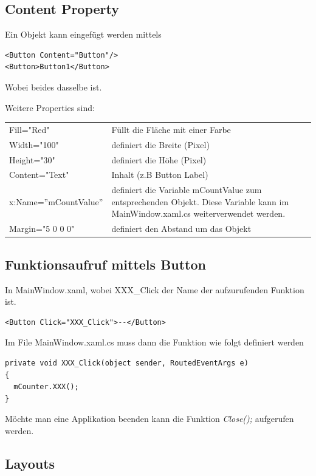 \subsection{Content Property}
Ein Objekt kann eingefügt werden mittels
\begin{lstlisting}[style=CSharp]
<Button Content="Button"/>
<Button>Button1</Button>
\end{lstlisting}
Wobei beides dasselbe ist.


Weitere Properties sind:\\
\begin{tabular}{lp{12cm}}
  Fill="Red" & Füllt die Fläche mit einer Farbe \\
  Width="100" & definiert die Breite (Pixel) \\
  Height="30" & definiert die Höhe (Pixel) \\
  Content="Text" & Inhalt (z.B Button Label) \\
  x:Name=''mCountValue'' & definiert die Variable mCountValue zum entsprechenden Objekt.
                         Diese Variable kann im MainWindow.xaml.cs weiterverwendet werden.\\
  Margin="5 0 0 0" & definiert den Abstand um das Objekt\\
\end{tabular}

\subsection{Funktionsaufruf mittels Button}
In MainWindow.xaml, wobei XXX\_Click der Name der aufzurufenden Funktion ist.
\begin{lstlisting}[style=CSharp]
<Button Click="XXX_Click">--</Button>
\end{lstlisting}


Im File MainWindow.xaml.cs muss dann die Funktion wie folgt definiert werden
\begin{lstlisting}[style=CSharp]
private void XXX_Click(object sender, RoutedEventArgs e)
{
  mCounter.XXX();
}
\end{lstlisting}

Möchte man eine Applikation beenden kann die Funktion \textit{Close();} aufgerufen werden.

\subsection{Layouts}
